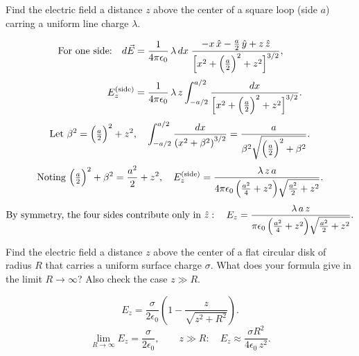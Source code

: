 

%
%

\newcommand{\hmwkTitle}{HW 03}
\newcommand{\hmwkSubTitle}{Assignment 3}
\newcommand{\hmwkDueDate}{February 20th, 2025}
\newcommand{\hmwkDueTime}{11:59 PM}
\newcommand{\hmwkClass}{PHYS 313}
\newcommand{\hmwkClassTime}{0101}
\newcommand{\hmwkClassInstructor}{Dr. Ji}
\newcommand{\hmwkAuthorName}{\textbf{Vai Srivastava}}
\newcommand{\hmwkCompletionDate}{\today}


\maketitle
\pagebreak
\begin{hwkProblem}{2.4}{}

	Find the electric field a distance \( z \) above the center of a square loop (side \( a \)) carring a uniform line charge \( \lambda \).

	\hwkSol
	\[
	\begin{aligned}
	\text{For one side:}\quad
	d\vec{E} &= \frac{1}{4\pi\epsilon_0}\,\lambda\,dx\;\frac{-x\,\hat{x}-\frac{a}{2}\,\hat{y}+z\,\hat{z}}{\Bigl[x^2+\Bigl(\frac{a}{2}\Bigr)^2+z^2\Bigr]^{3/2}},\\[1mm]
	E_z^{(\text{side})} &= \frac{1}{4\pi\epsilon_0}\,\lambda\,z\int_{-a/2}^{a/2}\frac{dx}{\Bigl[x^2+\Bigl(\tfrac{a}{2}\Bigr)^2+z^2\Bigr]^{3/2}}.
	\end{aligned}
	\]
	\[
	\text{Let } \beta^2=\Bigl(\tfrac{a}{2}\Bigr)^2+z^2,\quad
	\int_{-a/2}^{a/2}\frac{dx}{\left(x^2+\beta^2\right)^{3/2}}
	=\frac{a}{\beta^2\sqrt{\Bigl(\tfrac{a}{2}\Bigr)^2+\beta^2}}.
	\]
	\[
	\text{Noting } \Bigl(\tfrac{a}{2}\Bigr)^2+\beta^2=\frac{a^2}{2}+z^2,\quad
	E_z^{(\text{side})}=\frac{\lambda\,z\,a}{4\pi\epsilon_0\,\Bigl(\frac{a^2}{4}+z^2\Bigr)\sqrt{\frac{a^2}{2}+z^2}}.
	\]
	\[
	\text{By symmetry, the four sides contribute only in } \hat{z}:\quad
	E_z=\frac{\lambda\,a\,z}{\pi\epsilon_0\,\Bigl(\frac{a^2}{4}+z^2\Bigr)\sqrt{\frac{a^2}{2}+z^2}}.
	\]

\end{hwkProblem}
\begin{hwkProblem}{2.6}{}

	Find the electric field a distance \( z \) above the center of a flat circular disk of radius \( R \) that carries a uniform surface charge \( \sigma \). What does your formula give in the limit \( R \to \infty \)? Also check the case \( z \gg R \).

	\hwkSol

	\[
	E_z=\frac{\sigma}{2\epsilon_0}\left(1-\frac{z}{\sqrt{z^2+R^2}}\right).
	\]
	\[
	\lim_{R\to\infty}E_z=\frac{\sigma}{2\epsilon_0},\qquad
	z\gg R:\quad E_z\approx\frac{\sigma R^2}{4\epsilon_0\,z^2}.
	\]

\end{hwkProblem}
